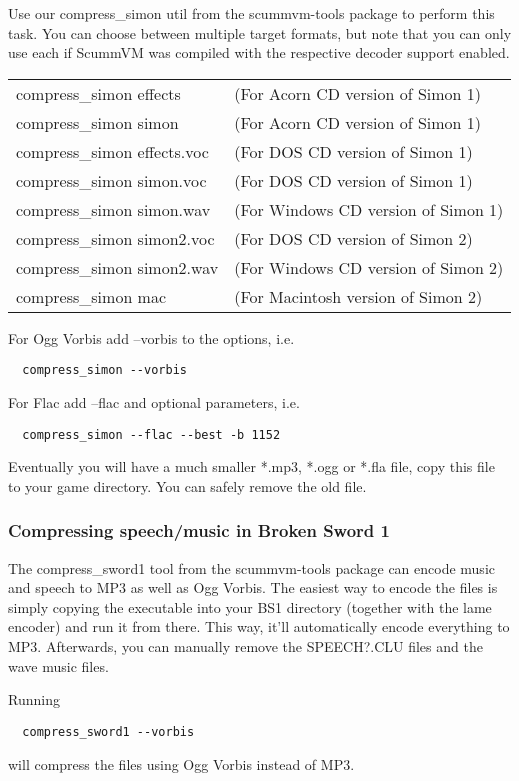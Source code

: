 Use our compress\_simon util from the scummvm-tools package to perform this task.
You can choose between multiple target formats, but note that you can only use
each if ScummVM was compiled with the respective decoder support enabled.

\begin{tabular}[h]{ll}
  compress\_simon effects    &(For Acorn CD version of Simon 1)\\
  compress\_simon simon      &(For Acorn CD version of Simon 1)\\
  compress\_simon effects.voc&(For DOS CD version of Simon 1)\\
  compress\_simon simon.voc  &(For DOS CD version of Simon 1)\\
  compress\_simon simon.wav  &(For Windows CD version of Simon 1)\\
  compress\_simon simon2.voc &(For DOS CD version of Simon 2)\\
  compress\_simon simon2.wav &(For Windows CD version of Simon 2)\\
  compress\_simon mac        &(For Macintosh version of Simon 2)\\
\end{tabular}

For Ogg Vorbis add --vorbis to the options, i.e.
\begin{verbatim}
  compress_simon --vorbis
\end{verbatim}
%
For Flac add --flac and optional parameters, i.e.
\begin{verbatim}
  compress_simon --flac --best -b 1152
\end{verbatim}
%
Eventually you will have a much smaller *.mp3, *.ogg or *.fla file, copy this
file to your game directory. You can safely remove the old file.

\subsubsection{Compressing speech/music in Broken Sword 1}

The compress\_sword1 tool from the scummvm-tools package can encode music and
speech to MP3 as well as Ogg Vorbis.
The easiest way to encode the files is simply copying the executable into your
BS1 directory (together with the lame encoder) and run it from there.
This way, it'll automatically encode everything to MP3.
Afterwards, you can manually remove the SPEECH?.CLU files and the wave music
files.

Running
\begin{verbatim}
  compress_sword1 --vorbis
\end{verbatim}
%
will compress the files using Ogg Vorbis instead of MP3.

